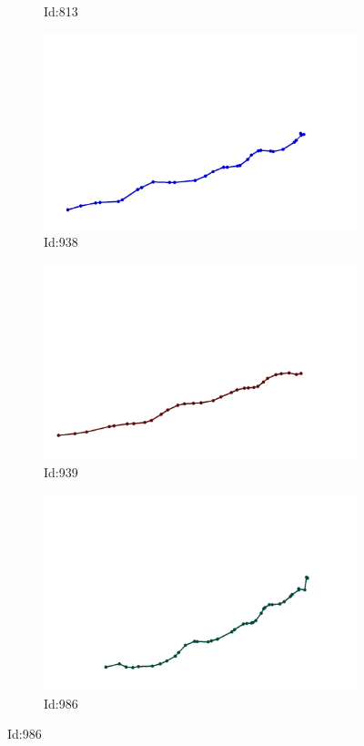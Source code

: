 \documentclass[12pt,twoside]{report}
\begin{document}
\begin{figure}
\begin{subfigure}[b]{0.20\textwidth}
\caption{Id:813}
\end{subfigure}
\begin{subfigure}[b]{0.20\textwidth}
\centering
\includegraphics[width=\textwidth]{../../trajectories/938.png}
\caption{Id:938}
\end{subfigure}
\begin{subfigure}[b]{0.20\textwidth}
\centering
\includegraphics[width=\textwidth]{../../trajectories/939.png}
\caption{Id:939}
\end{subfigure}
\begin{subfigure}[b]{0.20\textwidth}
\centering
\includegraphics[width=\textwidth]{../../trajectories/986.png}
\caption{Id:986}
\end{subfigure}
\end{figure}
\end{document}
